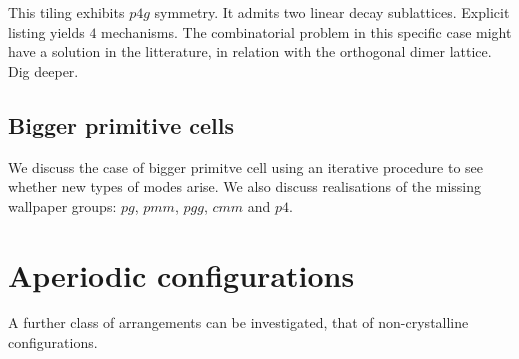 			This tiling exhibits $p4g$ symmetry. It admits two linear decay sublattices. Explicit listing yields $4$ mechanisms. The combinatorial problem in this specific case might have a solution in the litterature, in relation with the orthogonal dimer lattice. Dig deeper.
			
	\subsection{Bigger primitive cells}
		\label{sec:nxnpc}
		
		We discuss the case of bigger primitve cell using an iterative procedure to see whether new types of modes arise. We also discuss realisations of the missing wallpaper groups: $pg$, $pmm$, $pgg$, $cmm$ and $p4$.
			
		
\section{Aperiodic configurations}
\label{sec:aperio}

A further class of arrangements can be investigated, that of non-crystalline configurations. 

